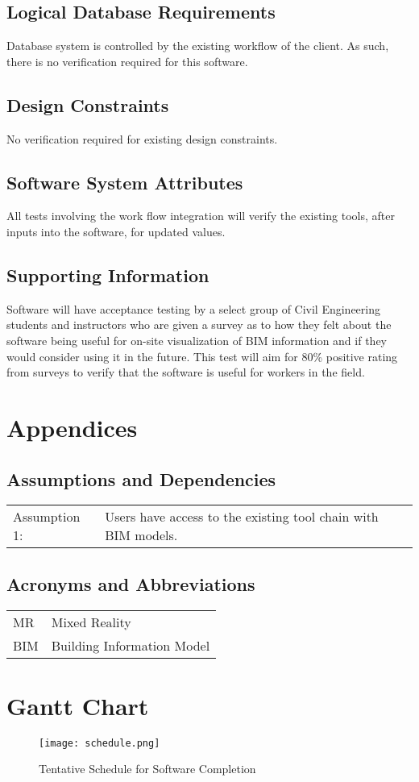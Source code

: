 \documentclass[onecolumn, draftclsnofoot,10pt, compsoc]{IEEEtran}
\begin{document}
    \subsection{Logical Database Requirements}
    Database system is controlled by the existing workflow of the client. As such, there is no verification required for this software.
    \subsection{Design Constraints}
    No verification required for existing design constraints.
    \subsection{Software System Attributes}
    All tests involving the work flow integration will verify the existing tools, after inputs into the software, for updated values.
    \subsection{Supporting Information}
    Software will have acceptance testing by a select group of Civil Engineering students and instructors who are given a survey as to how they felt about the software being useful for on-site visualization of BIM information and if they would consider using it in the future. This test will aim for 80\% positive rating from surveys to verify that the software is useful for workers in the field.\par

\pagebreak
\section{Appendices}
\subsection{Assumptions and Dependencies}
    \begin{table}[ht]
        \begin{tabular}{l p{100mm}}
           Assumption 1: & Users have access to the existing tool chain with BIM models.
        \end{tabular}
    \end{table} 
\subsection{Acronyms and Abbreviations}
    \begin{table}[ht]
        \begin{tabular}{l p{100mm}}
           MR & Mixed Reality\\
           BIM & Building Information Model
        \end{tabular}
    \end{table}

\pagebreak
\section{Gantt Chart}
    \begin{figure}[ht]
        \centering
            \texttt{[image: schedule.png]}
        \caption{Tentative Schedule for Software Completion}
    \end{figure}
\end{document}
